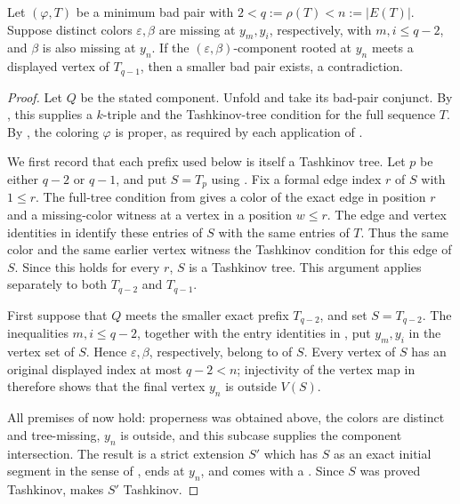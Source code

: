 \begin{helper}
Let \((\varphi,T)\) be a minimum bad pair with
\(2<q:=\rho(T)<n:=|E(T)|\).  Suppose distinct colors
\(\varepsilon,\beta\) are missing at \(y_m,y_i\), respectively, with
\(m,i\le q-2\), and \(\beta\) is also missing at \(y_n\).  If the
\((\varepsilon,\beta)\)-component rooted at \(y_n\) meets a displayed
vertex of \(T_{q-1}\), then a smaller bad pair exists, a contradiction.
\end{helper}
\begin{proof}
Let \(Q\) be the stated component.  Unfold
 and take its bad-pair conjunct.  By
, this supplies a \(k\)-triple and the
Tashkinov-tree condition for the full sequence \(T\).  By
, the coloring \(\varphi\) is proper, as required by
each application of .

We first record that each prefix used below is itself a Tashkinov tree.
Let \(p\) be either \(q-2\) or \(q-1\), and put
\(S=T_p\) using .  Fix a formal edge index
\(r\) of \(S\) with \(1\le r\).  The full-tree condition from
 gives a color of the exact edge in position
\(r\) and a missing-color witness at a vertex in a position
\(w\le r\).  The edge and vertex identities in
 identify these entries of \(S\) with the
same entries of \(T\).  Thus the same color and the same earlier vertex
witness the Tashkinov condition for this edge of \(S\).  Since this
holds for every \(r\), \(S\) is a Tashkinov tree.  This argument applies
separately to both \(T_{q-2}\) and \(T_{q-1}\).

First suppose that \(Q\) meets the smaller exact prefix \(T_{q-2}\),
and set \(S=T_{q-2}\).  The inequalities \(m,i\le q-2\), together with
the entry identities in , put \(y_m,y_i\)
in the vertex set  of \(S\).  Hence
\(\varepsilon,\beta\), respectively, belong to
 of \(S\).  Every vertex of \(S\) has an
original displayed index at most \(q-2<n\); injectivity of the vertex
map in  therefore shows that the final vertex
\(y_n\) is outside \(V(S)\).

All premises of  now hold:
properness was obtained above, the colors are distinct and tree-missing,
\(y_n\) is outside, and this subcase supplies the component
intersection.  The result is a strict extension \(S'\) which has \(S\)
as an exact initial segment in the sense of
, ends at \(y_n\), and comes with a
.  Since \(S\) was proved
Tashkinov, 
makes \(S'\) Tashkinov.


\end{proof}
